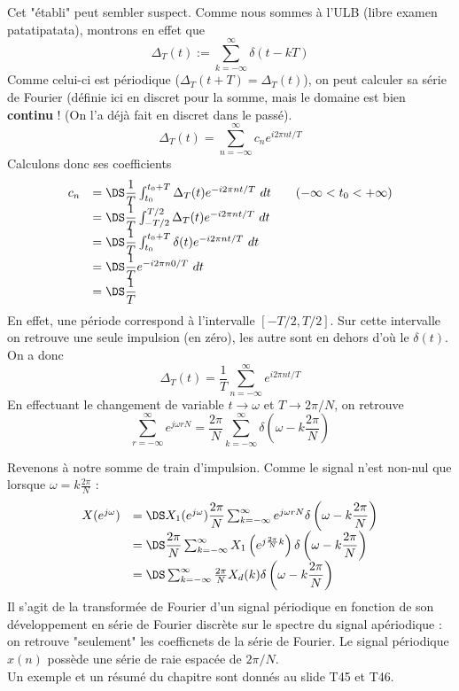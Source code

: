 Cet "établi" peut sembler suspect. Comme nous sommes à l'ULB (libre examen patatipatata), montrons 
en effet que 
\begin{equation}
\Delta_T(t) := \sum_{k=-\infty}^\infty \delta(t-kT)
\end{equation}
Comme celui-ci est périodique ($\Delta_T(t+T)=\Delta_T(t)$), on peut calculer sa série de Fourier 
(définie ici en discret pour la somme, mais le domaine est bien \textbf{continu} ! (On l'a déjà 
fait en discret dans le passé). 
\begin{equation}
\Delta_T(t) = \sum_{n=-\infty}^\infty c_ne^{i2\pi nt/T}
\end{equation}
Calculons donc ses coefficients
\begin{equation}
\begin{array}{ll}
c_n &= \DS \dfrac{1}{T}\int_{t_0}^{t_0+T} \Delta_T(t)e^{-i2\pi nt/T}\ dt\qquad (-\infty < t_0<+\infty)\\
&= \DS \dfrac{1}{T}\int_{-T/2}^{T/2} \Delta_T(t)e^{-i2\pi nt/T}\ dt \\
&= \DS \dfrac{1}{T}\int_{t_0}^{t_0+T} \delta(t) e^{-i2\pi nt/T}\ dt \\
&= \DS \dfrac{1}{T} e^{-i2\pi n0/T}\ dt\\
&= \DS \dfrac{1}{T}
\end{array}
\end{equation}
En effet, une période correspond à l'intervalle $[-T/2,T/2]$. Sur cette intervalle on retrouve une 
seule impulsion (en zéro), les autre sont en dehors d'où le $\delta(t)$. On a donc
\begin{equation}
\Delta_T(t) = \dfrac{1}{T}\sum_{n=-\infty}^\infty e^{i2\pi nt/T}
\end{equation}
En effectuant le changement de variable $t\rightarrow\omega$ et $T\rightarrow 2\pi/N$,  on retrouve
\begin{equation}
\sum_{r=-\infty}^\infty e^{j\omega rN} = \dfrac{2\pi}{N}\sum_{k=-\infty}^\infty \delta\left(\omega-k\frac{2\pi}{N}
\right)
\end{equation}

Revenons à notre somme de train d'impulsion. Comme le signal n'est non-nul que lorsque 
$\omega = k\frac{2\pi}{N}$ :
\begin{equation}
\begin{array}{ll}
X(e^{j\omega}) &= \DS X_1(e^{j\omega})\dfrac{2\pi}{N}\sum_{k=-\infty}^\infty e^{j\omega rN}\delta\left(
\omega-k\dfrac{2\pi}{N}\right)\\
&=\DS \dfrac{2\pi}{N}\sum_{k=-\infty}^\infty X_1\left(e^{j\frac{2\pi}{N}k}\right)\delta\left(
\omega-k\dfrac{2\pi}{N}\right)\\
&=\DS \sum_{k=-\infty}^\infty \frac{2\pi}{N} X_d(k)\delta\left(\omega-k\dfrac{2\pi}{N}\right)\\
\end{array}
\end{equation}
Il s'agit de la transformée de Fourier d'un signal périodique en fonction de son développement 
en série de Fourier discrète sur le spectre du signal apériodique : on retrouve "seulement" les 
coefficnets de la série de Fourier. Le signal périodique $x(n)$ possède une série de raie espacée de $2\pi/N$.\\

Un exemple et un résumé du chapitre sont donnés au slide T45 et T46.





